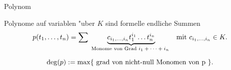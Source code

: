 \documentclass[class=article, crop=false]{standalone}
\begin{document}
\begin{zettel}{Polynom}
\begin{flashcard}[]{}
	\begin{definition}[Polynom]
		Polynome auf variablen "uber $K$ sind formelle endliche Summen
		\[
			p (  t_1,\dots,t_n ) = \sum \underbrace{c_{i_1 ,\dots, i_n} t_1^{i_{1}} \dots t_n^{i_n}}_\tx{Monome von Grad $i_1 + \dots + i_n$ } \tx{mit}  c_{i_1,\dots,i_n} \in  K
		.\]
	\end{definition}
\end{flashcard}
\begin{definition}
	\[
		\deg(p) := \max \set{\tx{grad von nicht-null Monomen von p} }
	.\]
\end{definition}
\end{zettel}
\end{document}
